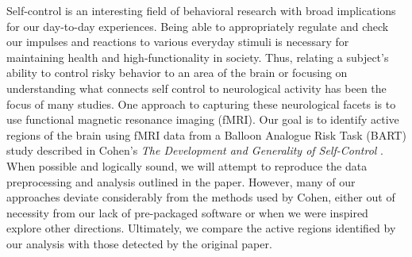 \par Self-control is an interesting field of behavioral research with broad 
implications for our day-to-day experiences. Being able to appropriately 
regulate and check our impulses and reactions to various everyday stimuli 
is necessary for maintaining health and high-functionality in society. 
Thus, relating a subject’s ability to control risky behavior to an area 
of the brain or focusing on understanding what connects self control to 
neurological activity has been the focus of many studies. One approach to 
capturing these neurological facets is to use functional magnetic resonance 
imaging (fMRI). Our goal is to identify active regions of the brain using 
fMRI data from a Balloon Analogue Risk Task (BART) study described in 
Cohen's \textit{The Development and Generality of Self-Control} 
\cite{CohenSelfControl}. When possible and logically sound, we will attempt 
to reproduce the data preprocessing and analysis outlined in the paper. 
However, many of our approaches deviate considerably from the methods 
used by Cohen, either out of necessity from our lack of pre-packaged 
software or when we were inspired explore other directions. Ultimately, we 
compare the active regions identified by our analysis with those detected 
by the original paper. 
